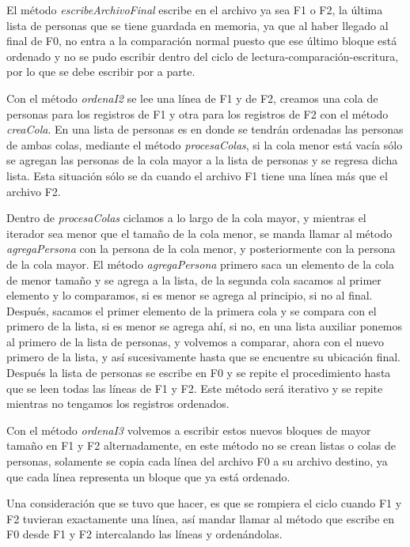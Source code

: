 \documentclass[letter]{report}
\begin{document}
El método \textit{escribeArchivoFinal} escribe en el archivo ya sea F1 o F2, la última lista de personas que se tiene guardada en memoria, ya que al haber llegado al final de F0, no entra a la comparación normal puesto que ese último bloque está ordenado y no se pudo escribir dentro del ciclo de lectura-comparación-escritura, por lo que se debe escribir por a parte.\medskip

Con el método \textit{ordenaI2} se lee una línea de F1 y de F2, creamos una cola de personas para los registros de F1 y otra para los registros de F2 con el método \textit{creaCola}. En una lista de personas es en donde se tendrán ordenadas las personas de ambas colas, mediante el método \textit{procesaColas}, si la cola menor está vacía sólo se agregan las personas de la cola mayor a la lista de personas y se regresa dicha lista. Esta situación sólo se da cuando el archivo F1 tiene una línea más que el archivo F2. \medskip

Dentro de \textit{procesaColas} ciclamos a lo largo de la cola mayor, y mientras el iterador sea menor que el tamaño de la cola menor, se manda llamar al método \textit{agregaPersona} con la persona de la cola menor, y posteriormente con la persona de la cola mayor. El método \textit{agregaPersona} primero saca un elemento de la cola de menor tamaño y se agrega a la lista, de la segunda cola sacamos al primer elemento y lo comparamos, si es menor se agrega al principio, si no al final. Después, sacamos el primer elemento de la primera cola y se compara con el primero de la lista, si es menor se agrega ahí, si no, en una lista auxiliar ponemos al primero de la lista de personas, y volvemos a comparar, ahora con el nuevo primero de la lista, y así sucesivamente hasta que se encuentre su ubicación final. Después la lista de personas se escribe en F0 y se repite el procedimiento hasta que se leen todas las líneas de F1 y F2. Este método será iterativo y se repite mientras no tengamos los registros ordenados.\medskip

Con el método \textit{ordenaI3} volvemos a escribir estos nuevos bloques de mayor tamaño en F1 y F2 alternadamente, en este método no se crean listas o colas de personas, solamente se copia cada línea del archivo F0 a su archivo destino, ya que cada línea representa un bloque que ya está ordenado.\medskip

Una consideración que se tuvo que hacer, es que se rompiera el ciclo cuando F1 y F2 tuvieran exactamente una línea, así mandar llamar al método que escribe en F0 desde F1 y F2 intercalando las líneas y ordenándolas.\medskip
\end{document}

